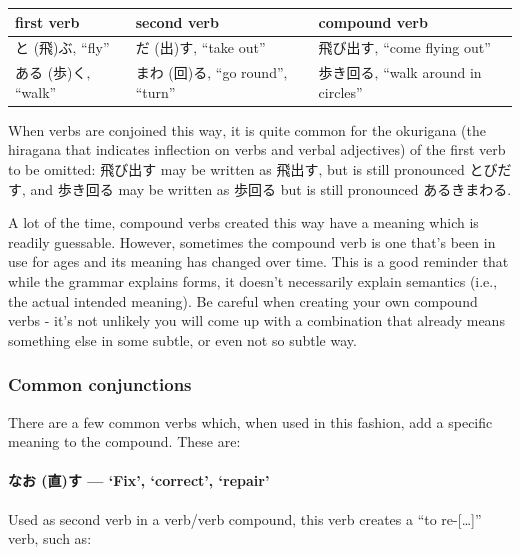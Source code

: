 \documentclass[11pt, b5paper, twoside, openright, onecolumn]{book}
\makeatletter
\newcommand*{\rtrubystack}[2]{{\relscale{0.5}%
  \begin{tabular}[b]{@{}c@{}}%
    {#1}\\%
    {\textscale{2}{#2}}%
  \end{tabular}}%
}
\DeclareRobustCommand*{\rtruby}[2]{%
  \mbox{%
    \setlength{\parskip}{0ex}%
    \BeginAccSupp{method=pdfstringdef,ActualText={#1}}%
      \rtrubystack{\phantom{#2}}{#1}%
      \llap{%
        \rtrubystack{#2}{\phantom{#1}}%
      }%
    \EndAccSupp{}%
  }%
}
\newcommand*{\rubystack}[2]{{\relscale{0.5}%
  \begin{tabular}[b]{@{}c@{}}%
    {#1}\\%
   {\textscale{2}{#2}}%
  \end{tabular}}%
}
\DeclareRobustCommand*{\ruby}[2]{%
  \mbox{%
    \setlength{\parskip}{0ex}%
    \BeginAccSupp{method=pdfstringdef,ActualText={#1}}%
      \rubystack{\phantom{#2}}{#1}%
      \llap{%
        \rubystack{#2}{\phantom{#1}}%
      }%
    \EndAccSupp{}%
  }%
}
\renewcommand*{\rtruby}[2]{#2 (#1)}%
\renewcommand*{\ruby}[2]{#2 (#1)}%
\newenvironment{mytabularcentered}[1]{\noindent
\begin{center}\begin{tabular}[h]{#1}}{\end{tabular}\end{center}}
\makeatother
\begin{document}
\vspace{0.5cm}
\smaller
\begin{center}
\begin{mytabularcentered}{| l  l  l |}\hline 
\rule{0pt}{2.4ex}first verb & second verb & compound verb\\ 
\hline
\rule{0pt}{3.6ex}\rtruby{飛}{と}ぶ‚ “fly” & \rtruby{出}{だ}す‚ “take out” & 飛び出す‚ “come flying out”\\ 
\rule{0pt}{3.6ex}\rtruby{歩}{ある}く‚ “walk” & \rtruby{回}{まわ}る‚ “go round”‚ “turn” & 歩き回る‚ “walk around in circles”\\ 
\hline 
\end{mytabularcentered}
\end{center}
\larger
\vspace{0.5cm}


When verbs are conjoined this way‚ it is quite common for the okurigana (the hiragana that indicates inflection on verbs and verbal adjectives) of the first verb to be omitted: 飛び出す may be written as 飛出す‚ but is still pronounced とびだす‚ and 歩き回る may be written as 歩回る but is still pronounced あるきまわる.

A lot of the time‚ compound verbs created this way have a meaning which is readily guessable. However‚ sometimes the compound verb is one that’s been in use for ages and its meaning has changed over time. This is a good reminder that while the grammar explains forms‚ it doesn’t necessarily explain semantics (i.e.‚ the actual intended meaning). Be careful when creating your own compound verbs - it’s not unlikely you will come up with a combination that already means something else in some subtle‚ or even not so subtle way.

\subsubsection{Common conjunctions}

There are a few common verbs which‚ when used in this fashion‚ add a specific meaning to the compound. These are:

\paragraph{\ruby{直}{なお}す — ‘Fix’‚ ‘correct’‚ ‘repair’}

Used as second verb in a verb/verb compound‚ this verb creates a “to re-[…]” verb‚ such as:
\end{document}
